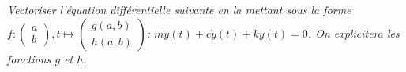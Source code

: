 \begin{multicols}{2}

\subparagraph{}
\textit{Vectoriser l'équation différentielle suivante en la mettant sous la forme  $f:\begin{pmatrix} a \\ b \end{pmatrix},t \mapsto \begin{pmatrix} g(a,b) \\ h(a,b) \end{pmatrix} $:
$m \ddot{y}(t) + c\dot{y}(t)  + k{y}(t) = 0$. On explicitera les fonctions $g$ et $h$.}
%



\end{multicols}




